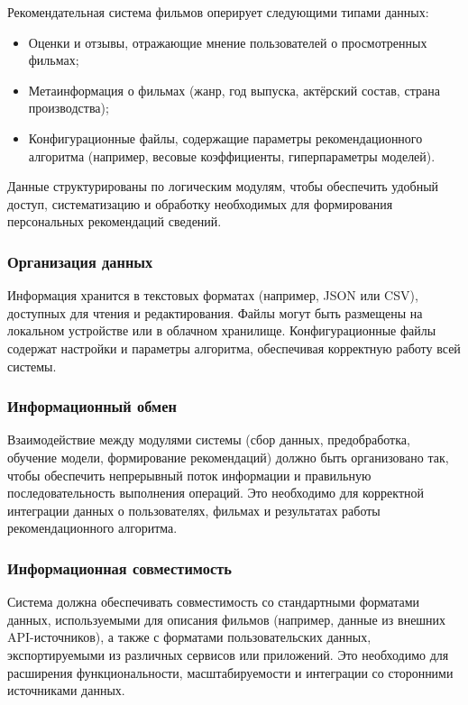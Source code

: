 Рекомендательная система фильмов оперирует следующими типами данных:
\begin{itemize}
	\item Оценки и отзывы, отражающие мнение пользователей о просмотренных фильмах;
	\item Метаинформация о фильмах (жанр, год выпуска, актёрский состав, страна производства);
	\item Конфигурационные файлы, содержащие параметры рекомендационного алгоритма (например, весовые коэффициенты, гиперпараметры моделей).
\end{itemize}

Данные структурированы по логическим модулям, чтобы обеспечить удобный доступ,
систематизацию и обработку необходимых для формирования персональных рекомендаций сведений.

\subsubsection{Организация данных}

Информация хранится в текстовых форматах (например, JSON или CSV), доступных для чтения и редактирования.
Файлы могут быть размещены на локальном устройстве или в облачном хранилище.
Конфигурационные файлы содержат настройки и параметры алгоритма,
обеспечивая корректную работу всей системы.

\subsubsection{Информационный обмен}

Взаимодействие между модулями системы (сбор данных, предобработка, обучение модели, формирование рекомендаций)
должно быть организовано так, чтобы обеспечить непрерывный поток информации и правильную
последовательность выполнения операций. Это необходимо для корректной интеграции данных о пользователях,
фильмах и результатах работы рекомендационного алгоритма.

\subsubsection{Информационная совместимость}

Система должна обеспечивать совместимость со стандартными форматами данных,
используемыми для описания фильмов (например, данные из внешних API-источников),
а также с форматами пользовательских данных, экспортируемыми из различных
сервисов или приложений. Это необходимо для расширения функциональности,
масштабируемости и интеграции со сторонними источниками данных.

